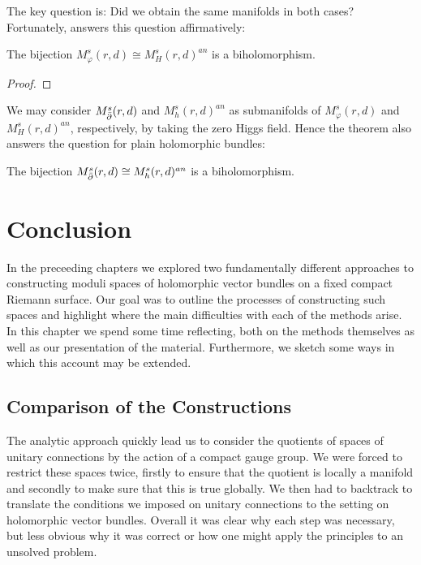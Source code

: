 \documentclass[12pt]{ociamthesis}  %
\begin{document}
The key question is: Did we obtain the same manifolds in both cases?
Fortunately, \cite[Theorem C]{fan2020} answers this question affirmatively:

\begin{theorem}
  The bijection
  $M^s_\varphi(r,d) \cong M^s_H(r,d)^{an}$
  is a biholomorphism.
  \begin{proof}
    \missingproof
  \end{proof}
\end{theorem}

We may consider $M^s_{\bar{\partial}}(r,d)$ and $M^s_h(r,d)^{an}$ as submanifolds
of $M^s_\varphi(r,d)$ and $M^s_H(r,d)^{an}$, respectively, by taking
the zero Higgs field. Hence the theorem also answers the question for plain
holomorphic bundles:

\begin{corollary}
  The bijection
  $M^s_{\bar{\partial}}(r,d) \cong M^s_h(r,d)^{an}$
  is a biholomorphism.
\end{corollary}

\chapter{Conclusion}

In the preceeding chapters we explored two fundamentally different
approaches to constructing moduli spaces of holomorphic vector
bundles on a fixed compact Riemann surface. Our goal was to
outline the processes of constructing such spaces and highlight where
the main difficulties with each of the methods arise.
In this chapter we spend some time reflecting, both on the methods
themselves as well as our presentation of the material.
Furthermore, we sketch some ways in which this account may be
extended.

\section{Comparison of the Constructions}

The analytic approach
quickly lead us to consider the quotients of spaces of unitary connections
by the action of a compact gauge group. We were forced to restrict these
spaces twice, firstly to ensure that the quotient is locally a manifold
and secondly to make sure that this is true globally. We then had to
backtrack to translate the conditions we imposed on unitary connections
to the setting on holomorphic vector bundles. Overall it was clear
why each step was necessary, but less obvious why it was correct or
how one might apply the principles to an unsolved problem.
\end{document}
